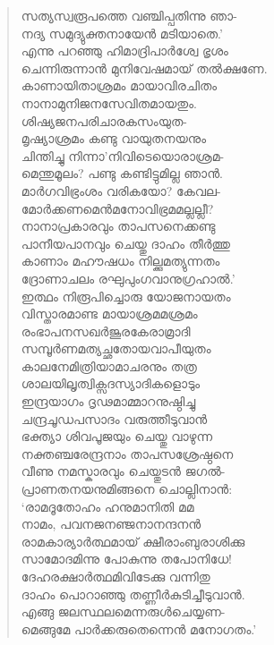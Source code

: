 \begin{verse}
സത്യസ്വരൂപത്തെ വഞ്ചിപ്പതിന്നു ഞാ-\\
നദ്യ സമുദ്യുക്തനായേന്‍ മടിയാതെ.’\\
എന്നു പറഞ്ഞു ഹിമാദ്രിപാര്‍ശ്വേ ഭൃശം\\
ചെന്നിരുന്നാന്‍ മുനിവേഷമായ് തല്‍ക്ഷണേ.\\
കാണായിതാശ്രമം മായാവിരചിതം\\
നാനാമുനിജനസേവിതമായതും.\\
ശിഷ്യജനപരിചാരകസംയുത-\\
മൃഷ്യാശ്രമം കണ്ടു വായുതനയനും\\
ചിന്തിച്ചു നിന്നാ’നിവിടെയൊരാശ്രമ-\\
മെന്തുമൂലം? പണ്ടു കണ്ടിട്ടുമില്ല ഞാന്‍.\\
മാര്‍ഗവിഭ്രംശം വരികയോ? കേവല-\\
മോര്‍ക്കണമെന്‍മനോവിഭ്രമമല്ലല്ലീ?\\
നാനാപ്രകാരവും താപസനെക്കണ്ടു\\
പാനീയപാനവും ചെയ്തു ദാഹം തീര്‍ത്തു\\
കാണാം മഹൗഷധം നില്ക്കുമത്യുന്നതം\\
ദ്രോണാചലം രഘുപുംഗവാനുഗ്രഹാല്‍.’\\
ഇത്ഥം നിരൂപിച്ചൊരു യോജനായതം\\
വിസ്താരമാണ്ട മായാശ്രമമശ്രമം\\
രംഭാപനസഖര്‍ജൂരകേരാമ്രാദി\\
സമ്പൂര്‍ണമത്യച്ഛതോയവാപീയുതം\\
കാലനേമിത്രിയാമാചരനും തത്ര\\
ശാലയിലൃത്വിക്സദസ്യാദികളൊടും\\
ഇന്ദ്രയാഗം ദൃഢമാമ്മാറനുഷ്ഠിച്ചു\\
ചന്ദ്രചൂഡപസാദം വരുത്തീടുവാന്‍\\
ഭക്ത്യാ ശിവപൂജയും ചെയ്തു വാഴുന്ന\\
നക്തഞ്ചരേന്ദ്രനാം താപസശ്രേഷ്ഠനെ\\
വീണു നമസ്കാരവും ചെയ്തുടന്‍ ജഗല്‍-\\
പ്രാണതനയനുമിങ്ങനെ ചൊല്ലിനാന്‍:\\
‘രാമദൂതോഹം ഹനുമാനിതി മമ\\
നാമം, പവനജനഞ്ജനാനന്ദനന്‍\\
രാമകാര്യാര്‍ത്ഥമായ് ക്ഷീരാംബുരാശിക്കു\\
സാമോദമിന്നു പോകുന്നു തപോനിധേ!\\
ദേഹരക്ഷാര്‍ത്ഥമിവിടേക്കു വന്നിതു\\
ദാഹം പൊറാഞ്ഞു തണ്ണീര്‍കുടിച്ചീടുവാന്‍.\\
എങ്ങു ജലസ്ഥലമെന്നരുള്‍ചെയ്യണ-\\
മെങ്ങുമേ പാര്‍ക്കരുതെന്നെന്‍ മനോഗതം.’\\

\end{verse}
